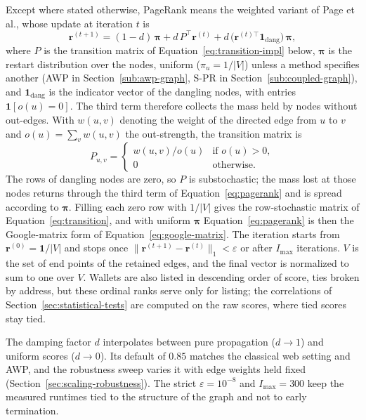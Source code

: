 Except where stated otherwise, PageRank means the weighted variant of Page et al., whose update at iteration $t$ is
\begin{equation}
\label{eq:pagerank}
\mathbf{r}^{(t+1)}
=
(1-d)\,\boldsymbol{\pi}
+
d\,P^{\top}\mathbf{r}^{(t)}
+
d\,\bigl(\mathbf{r}^{(t)\top}\mathbf{1}_{\mathrm{dang}}\bigr)\,\boldsymbol{\pi},
\end{equation}
where $P$ is the transition matrix of Equation~\eqref{eq:transition-impl} below, $\boldsymbol{\pi}$ is the restart distribution over the nodes, uniform ($\pi_u=1/|V|$) unless a method specifies another (AWP in Section~\ref{sub:awp-graph}, S-PR in Section~\ref{sub:coupled-graph}), and $\mathbf{1}_{\mathrm{dang}}$ is the indicator vector of the dangling nodes, with entries $\mathbf{1}[o(u)=0]$. The third term therefore collects the mass held by nodes without out-edges. With $w(u,v)$ denoting the weight of the directed edge from $u$ to $v$ and $o(u)=\sum_v w(u,v)$ the out-strength, the transition matrix is
\begin{equation}
\label{eq:transition-impl}
P_{u,v}
=
\begin{cases}
w(u,v)/o(u) & \text{if }o(u)>0,\\
0 & \text{otherwise.}
\end{cases}
\end{equation}
The rows of dangling nodes are zero, so $P$ is substochastic; the mass lost at those nodes returns through the third term of Equation~\eqref{eq:pagerank} and is spread according to $\boldsymbol{\pi}$. Filling each zero row with $1/|V|$ gives the row-stochastic matrix of Equation~\eqref{eq:transition}, and with uniform $\boldsymbol{\pi}$ Equation~\eqref{eq:pagerank} is then the Google-matrix form of Equation~\eqref{eq:google-matrix}. The iteration starts from $\mathbf{r}^{(0)}=\mathbf{1}/|V|$ and stops once $\|\mathbf{r}^{(t+1)}-\mathbf{r}^{(t)}\|_1 < \varepsilon$ or after $I_{\max}$ iterations. $V$ is the set of end points of the retained edges, and the final vector is normalized to sum to one over $V$. Wallets are also listed in descending order of score, ties broken by address, but these ordinal ranks serve only for listing; the correlations of Section~\ref{sec:statistical-tests} are computed on the raw scores, where tied scores stay tied.

The damping factor $d$ interpolates between pure propagation ($d\to 1$) and uniform scores ($d\to 0$). Its default of $0.85$ matches the classical web setting and AWP, and the robustness sweep varies it with edge weights held fixed (Section~\ref{sec:scaling-robustness}). The strict $\varepsilon=10^{-8}$ and $I_{\max}=300$ keep the measured runtimes tied to the structure of the graph and not to early termination.

